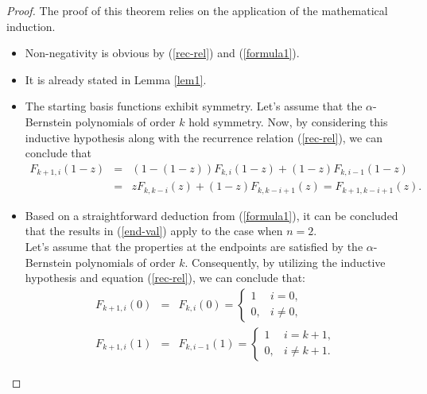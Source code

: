 \documentclass[preprint,12pt]{elsarticle}
\theoremstyle{definition}
\theoremstyle{theorem}
\theoremstyle{lemma}
\theoremstyle{example}
\theoremstyle{remark}
\theoremstyle{prop}
\begin{document}
\begin{proof}
The proof of this theorem relies on the application of the  mathematical induction.
\begin{itemize}
\item [\rm{(a)}]
Non-negativity is obvious by  (\ref{rec-rel}) and  (\ref{formula1}).
\item [\rm{(b)}]
It is  already stated in Lemma \ref{lem1}.
\item [\rm{(c)}]
The starting basis functions exhibit symmetry. Let's assume that the $\alpha$-Bernstein polynomials of order $k$  hold  symmetry. Now, by considering this inductive hypothesis along with the recurrence relation (\ref{rec-rel}), we can conclude that
\begin{eqnarray*}
F_{k+1,i}(1-z)&=&(1-(1-z))F_{k,i}(1-z)+(1-z)F_{k,i-1}(1-z)\\
&=&zF_{k,k-i}(z)+(1-z)F_{k,k-i+1}(z)=F_{k+1,k-i+1}(z).
\end{eqnarray*}
\item [\rm{(d)}]
Based on a straightforward deduction from (\ref{formula1}), it can be concluded that the results in (\ref{end-val}) apply to the case when $n=2$.
\\
Let's assume that the properties at the endpoints are satisfied by the $\alpha$-Bernstein polynomials of order $k$. Consequently, by utilizing the inductive hypothesis and equation (\ref{rec-rel}), we can conclude that:
\begin{eqnarray}
F_{k+1,i}(0)&=&F_{k,i}(0)= 
\begin{cases} 
1 & i=0,
\\ 
0, & i\neq 0,
\end{cases} \nonumber
\\ %
F_{k+1,i}(1)&=&F_{k,i-1}(1)= 
\begin{cases} 
1 & i=k+1,
\\ 
0, & i\neq k+1.
\end{cases} \nonumber
\end{eqnarray}



\end{itemize}
\end{proof}
\end{document}
